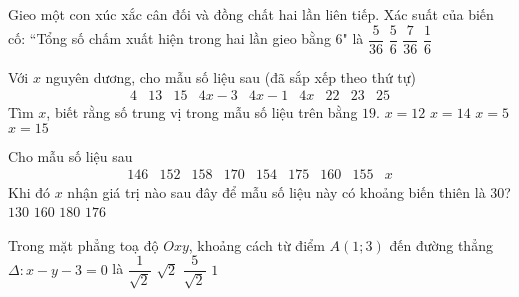\begin{ex}%
	Gieo một con xúc xắc cân đối và đồng chất hai lần liên tiếp. Xác suất của biến cố: “Tổng số chấm xuất hiện trong hai lần gieo bằng $6$" là
	\choice
	{\True $\dfrac{5}{36}$}
	{$\dfrac{5}{6}$}
	{$\dfrac{7}{36}$}
	{$\dfrac{1}{6}$}
\end{ex}
\begin{ex}%
	 Với $x$ nguyên dương, cho mẫu số liệu sau (đã sắp xếp theo thứ tự)
	$$
	\begin{array}{lllllllll}
		4 & 13 & 15 & 4 x-3 & 4 x-1 & 4 x & 22 & 23 & 25
	\end{array}
	$$
	Tìm $x$, biết rằng số trung vị trong mẫu số liệu trên bằng $19$.
	\choice
	{$x=12$}
	{$x=14$}
	{\True $x=5$}
	{$x=15$}
\end{ex}
\begin{ex}%
	Cho mẫu số liệu sau
	$$
	\begin{array}{lllllllll}
		146 & 152 & 158 & 170 & 154 & 175 & 160 & 155 & x
	\end{array}
	$$
	Khi đó $x$ nhận giá trị nào sau đây để mẫu số liệu này có khoảng biến thiên là $30$?
	\choice
	{$130$}
	{$160$}
	{$180$}
	{\True $176$}
\end{ex}
\begin{ex}%
	Trong mặt phẳng toạ độ $Oxy$, khoảng cách từ điểm $A(1; 3)$ đến đường thẳng \\$\Delta\colon x-y-3=0$ là
	\choice
	{$\dfrac{1}{\sqrt{2}}$}
	{$\sqrt{2}$}
	{\True $\dfrac{5}{\sqrt{2}}$}
	{$1$}
\end{ex}


